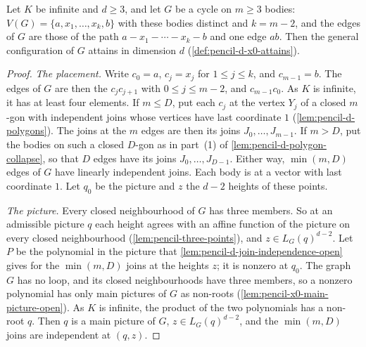 \begin{theorem}
  \label{thm:pencil-d-cycle}
  \leanok
  Let $K$ be infinite and $d \ge 3$, and let $G$ be a cycle on $m \ge 3$
  bodies: $V(G) = \{a, x_1, \dots, x_k, b\}$ with these bodies distinct
  and $k = m - 2$, and the edges of $G$ are those of the path
  $a - x_1 - \cdots - x_k - b$ and one edge $ab$. Then the general
  configuration of $G$ attains in dimension $d$
  (\cref{def:pencil-d-x0-attains}).
\end{theorem}
\begin{proof}
  \leanok
  \emph{The placement.} Write $c_0 = a$, $c_j = x_j$ for
  $1 \le j \le k$, and $c_{m-1} = b$. The edges of $G$ are then the
  $c_j c_{j+1}$ with $0 \le j \le m - 2$, and $c_{m-1} c_0$. As $K$ is
  infinite, it has at least four elements. If $m \le D$, put each $c_j$
  at the vertex $Y_j$ of a closed $m$-gon with independent joins whose
  vertices have last coordinate $1$ (\cref{lem:pencil-d-polygons}). The
  joins at the $m$ edges are then its joins $J_0, \dots, J_{m-1}$. If
  $m > D$, put the bodies on such a closed $D$-gon as in part~(1) of
  \cref{lem:pencil-d-polygon-collapse}, so that $D$ edges have its joins
  $J_0, \dots, J_{D-1}$. Either way, $\min(m, D)$ edges of $G$ have
  linearly independent joins. Each body is at a vector with last
  coordinate $1$. Let $q_0$ be the picture and $z$ the $d - 2$ heights of
  these points.

  \emph{The picture.} Every closed neighbourhood of $G$ has three
  members. So at an admissible picture $q$ each height agrees with an
  affine function of the picture on every closed neighbourhood
  (\cref{lem:pencil-three-points}), and $z \in L_G(q)^{d-2}$. Let $P$ be
  the polynomial in the picture that
  \cref{lem:pencil-d-join-independence-open} gives for the $\min(m, D)$
  joins at the heights $z$; it is nonzero at $q_0$. The graph $G$ has no
  loop, and its closed neighbourhoods have three members, so a nonzero
  polynomial has only main pictures of $G$ as non-roots
  (\cref{lem:pencil-x0-main-picture-open}). As $K$ is infinite, the
  product of the two polynomials has a non-root $q$. Then $q$ is a main
  picture of $G$, $z \in L_G(q)^{d-2}$, and the $\min(m, D)$ joins are
  independent at $(q, z)$.


\end{proof}
